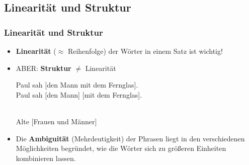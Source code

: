\subsection{Linearität und Struktur}


\begin{frame}
\frametitle{Linearität und Struktur}

\begin{itemize}
	\item \textbf{Linearität} ($\approx$ Reihenfolge) der Wörter in einem Satz ist wichtig!
	
	\z
	
	\z

\end{itemize}

\end{frame}

\begin{frame}

\begin{itemize}
	\item ABER: \textbf{Struktur} $\neq$ Linearität
	
	\eal 
	\ex Paul sah [den Mann mit dem Fernglas].\\ 
	\vs 
	\ex Paul sah [den 	Mann] [mit dem 	Fernglas].
	\zl
	
	\eal 
	\\
	\vs
	\ex Alte [Frauen und Männer]
	\zl

	\item Die \textbf{Ambiguität} (Mehrdeutigkeit) der Phrasen liegt in den verschiedenen Möglichkeiten begründet, wie die Wörter sich zu größeren Einheiten kombinieren lassen.

\end{itemize}

\end{frame}


